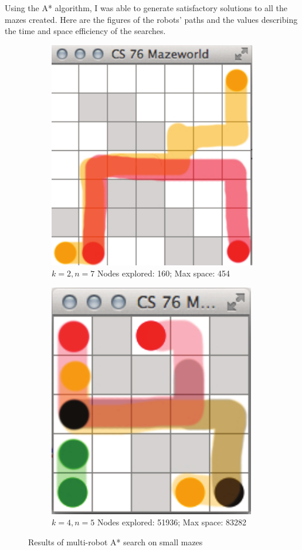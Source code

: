 \documentclass{article}
\begin{document}
Using the A* algorithm, I was able to generate satisfactory solutions to all the mazes created. Here are the figures of the robots' paths and the values describing the time and space efficiency of the searches.

\begin{figure}[!htb]
\centering
\begin{subfigure}{.5\textwidth}
  \centering
  \includegraphics[scale=.65]{multimaze7.pdf}
  \caption{{\bf $k=2, n=7$} Nodes explored: 160; Max space: 454}
\end{subfigure}%
\begin{subfigure}{.5\textwidth}
  \centering
  \includegraphics[scale=.65]{multimaze5.pdf}
  \caption{{\bf $k=4, n=5$} Nodes explored: 51936; Max space: 83282}
\end{subfigure}
\caption{Results of multi-robot A* search on small mazes}
\end{figure}
\end{document}
